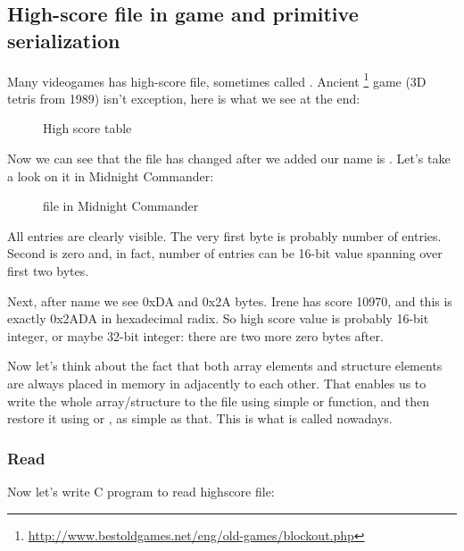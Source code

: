 \subsection{High-score file in  game and primitive serialization}

Many videogames has high-score file, sometimes called .
Ancient \footnote{\url{http://www.bestoldgames.net/eng/old-games/blockout.php}} game
(3D tetris from 1989) isn't exception, here is what we see at the end:

\begin{figure}[H]
\centering
{}
\caption{High score table}
\end{figure}

Now we can see that the file has changed after we added our name is .
Let's take a look on it in Midnight Commander:

\begin{figure}[H]
\centering
{}
\caption{ file in Midnight Commander}
\end{figure}

All entries are clearly visible.
The very first byte is probably number of entries.
Second is zero and, in fact, number of entries can be 16-bit value spanning over first two bytes.

Next, after  name we see 0xDA and 0x2A bytes.
Irene has score 10970, and this is exactly 0x2ADA in hexadecimal radix.
So high score value is probably 16-bit integer, or maybe 32-bit integer: there are two more zero bytes after.

Now let's think about the fact that both array elements and structure elements are always placed in memory in adjacently to each other.
That enables us to write the whole array/structure to the file using simple  or  function, 
and then restore it using  or , as simple as that.
This is what is called  nowadays.

\subsubsection{Read}

Now let's write C program to read highscore file:

